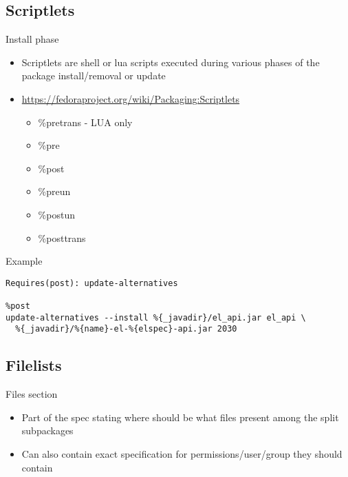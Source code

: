 \documentclass{beamer}
\begin{document}
\subsection{Scriptlets}

\begin{frame}[t]{Install phase}
	\begin{itemize}
    \item Scriptlets are shell or lua scripts executed during various phases of the package install/removal or update
    \item \url{https://fedoraproject.org/wiki/Packaging:Scriptlets}
        \begin{itemize}
        \item \%pretrans - LUA only
        \item \%pre
        \item \%post
        \item \%preun
        \item \%postun
        \item \%posttrans
        \end{itemize}
	\end{itemize}
\end{frame}

\begin{frame}[fragile]{Example}
	\begin{small}
	\begin{verbatim}
Requires(post): update-alternatives

%post
update-alternatives --install %{_javadir}/el_api.jar el_api \
  %{_javadir}/%{name}-el-%{elspec}-api.jar 2030
	\end{verbatim}
	\end{small}
\end{frame}

\subsection{Filelists}

\begin{frame}[t]{Files section}
	\begin{itemize}
	\item Part of the spec stating where should be what files present among the split subpackages
    \item Can also contain exact specification for permissions/user/group they should contain
	\end{itemize}
\end{frame}
\end{document}
